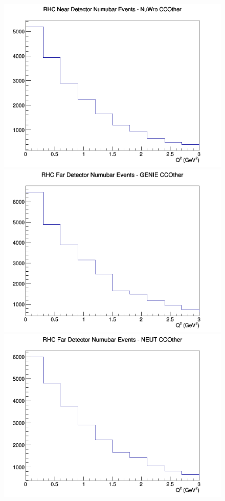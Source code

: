 \begin{figure}[h]
\includegraphics[width=\linewidth]{eff_Q2/FGT/CCOther_RHC_ND_numubar_Q2_NuWro.png}
\endminipage
\newline
{}
\includegraphics[width=\linewidth]{eff_Q2/FGT/CCOther_RHC_FD_numubar_Q2_GENIE.png}
\endminipage
{}
\includegraphics[width=\linewidth]{eff_Q2/FGT/CCOther_RHC_FD_numubar_Q2_NEUT.png}

\end{figure}
